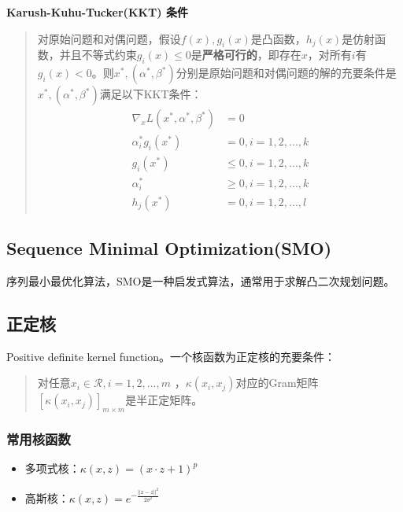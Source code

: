 \textbf{Karush-Kuhu-Tucker(KKT) 条件}\label{kkt}
\begin{quotation}
	对原始问题和对偶问题，假设$f(x), g_i(x)$是凸函数，$h_j(x)$是仿射函数，并且不等式约束$g_i(x) \leq 0$是\textbf{严格可行的}，即存在$x$，对所有$i$有$g_i(x) < 0$。则$x^*, (\alpha^*, \beta^*)$分别是原始问题和对偶问题的解的充要条件是$x^*, (\alpha^*, \beta^*)$满足以下KKT条件：
	\begin{align}\nonumber
		\nabla_x L(x^*, \alpha^*, \beta^*) &= 0 \nonumber \\
		\alpha_i^* g_i(x^*) &= 0, i = 1, 2, ..., k \nonumber \\
		g_i(x^*) &\leq 0, i = 1, 2, ..., k \nonumber \\
		\alpha_i^* &\geq 0, i = 1, 2, ..., k \nonumber \\ 
		h_j(x^*) &= 0, i = 1, 2, ..., l \nonumber 
	\end{align}
	
\end{quotation}

\subsection{Sequence Minimal Optimization(SMO)}\label{smo}
序列最小最优化算法，SMO是一种启发式算法，通常用于求解凸二次规划问题。

\subsection{正定核}\label{pdkf}
Positive definite kernel function。一个核函数为正定核的充要条件：
\begin{quotation}
	对任意$x_i \in \mathcal{R}, i = 1, 2, ..., m$ ，$\kappa(x_i, x_j)$对应的Gram矩阵 $[\kappa(x_i, x_j)]_{m \times m}$是半正定矩阵。
\end{quotation}

\subsubsection{常用核函数}
\begin{itemize}
	\item 多项式核：$\kappa(x, z) = (x \cdot z + 1)^p$
	\item 高斯核：$\kappa(x, z) = e^{- \frac{||x - z||^2}{2 \sigma^2}}$
\end{itemize}
